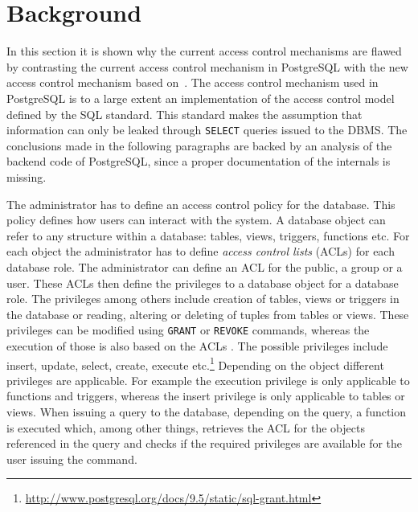 \section{Background}

In this section it is shown why the current access control mechanisms are flawed by contrasting the current access control mechanism in PostgreSQL with the new access control mechanism based on~\cite{guarnieri2016strong}.
%
The access control mechanism used in PostgreSQL is to a large extent an implementation of the access control model defined by the SQL standard.
%
This standard makes the assumption that information can only be leaked through \texttt{SELECT} queries issued to the DBMS. 
%
The conclusions made in the following paragraphs are backed by an analysis of the backend code of PostgreSQL, since a proper documentation of the internals is missing.


The administrator has to define an access control policy for the database. 
%
This policy defines how users can interact with the system.
%
A database object  can refer to any structure within a database: tables, views, triggers, functions etc.
%
For each object the administrator has to define \emph{access control lists} (ACLs) for each database role.
%
The administrator can define an ACL for the public, a group\remark{,} or a user. 
%
These ACLs then define the privileges to a database object for a database role.
%
The privileges among others include creation of tables, views or triggers in the database or reading, altering or deleting of tuples from tables or views.
%
These privileges can be modified using \texttt{GRANT} or \texttt{REVOKE} commands, whereas the execution of those is also based on the ACLs .
%
The possible privileges include insert, update, select, create, execute etc.\footnote{\url{http://www.postgresql.org/docs/9.5/static/sql-grant.html}}
%
Depending on the object different privileges are applicable. 
%
For example the execution privilege is only applicable to functions and triggers, whereas the insert privilege is only applicable to tables or views.
%
When issuing a query to the database, depending on the query, a function is executed which, among other things, retrieves the ACL for the objects referenced in the query and checks if the required privileges are available for the user issuing the command.

